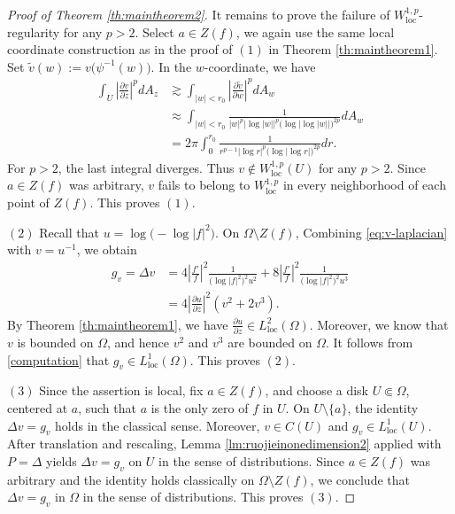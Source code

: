\documentclass[12pt,twoside]{amsart}
\numberwithin{equation}{section}
\numberwithin{definition}{section} %
\begin{document}
\begin{proof}[Proof of Theorem \ref{th:maintheorem2}]
It remains to prove the failure of $W^{1,p}_{\mathrm{loc}}$-regularity for any $p>2$. Select $a\in Z(f)$, we again use the same local coordinate construction as in the proof of $(1)$ in Theorem \ref{th:maintheorem1}. Set
$
\widetilde v(w):=v\bigl(\psi^{-1}(w)\bigr).
$
In the \(w\)-coordinate, we have
\[
\begin{aligned}
\int_U
\left|
\frac{\partial v}{\partial z}
\right|^p dA_z
&\gtrsim
\int_{|w|<r_0}
\left|
\frac{\partial\widetilde v}{\partial w}
\right|^p dA_w\\
&\approx
\int_{|w|<r_0}
\frac{1}
{|w|^p|\log|w||^p
\bigl(\log|\log|w||\bigr)^{2p}}dA_w\\
&=
2\pi\int_0^{r_0}
\frac{1}
{r^{p-1}|\log r|^p
\bigl(\log|\log r|\bigr)^{2p}}dr.
\end{aligned}
\]
For $p>2$, the last integral diverges. Thus $v\notin W^{1,p}_{\mathrm{loc}}(U)$ for any $p>2$. Since $a\in Z(f)$ was arbitrary, $v$ fails to belong to $W^{1,p}_{\mathrm{loc}}$ in every neighborhood of each point of $Z(f)$. This proves  $(1)$.

$(2)$ Recall that
$
u=\log\bigl(-\log|f|^2\bigr).
$
On $\Omega\setminus Z(f)$, Combining \eqref{eq:v-laplacian} with $v=u^{-1}$, we obtain
\begin{align} \label{computation}
g_v=\Delta v
&=
4\left|\frac{f'}{f}\right|^2
\frac{1}{\bigl(\log|f|^2\bigr)^2u^2}
+
8\left|\frac{f'}{f}\right|^2
\frac{1}{\bigl(\log|f|^2\bigr)^2u^3}\\ \nonumber
&=
4\left|
\frac{\partial u}{\partial z}
\right|^2
\left(
{v^2}+2{v^3}
\right).
\end{align}
By Theorem \ref{th:maintheorem1}, we have
$
\frac{\partial u}{\partial z}
\in L_{\mathrm{loc}}^2(\Omega).
$
Moreover, we know that $v$ is bounded on $\Omega$, and hence $v^{2}$ and $v^{3}$ are bounded on $\Omega$. It follows from \eqref{computation} that
$
g_v\in L_{\mathrm{loc}}^1(\Omega).
$
 This proves $(2)$.

$(3)$ Since the assertion is local, fix $a\in Z(f)$, and choose a disk $U\Subset\Omega$, centered at $a$, such that $a$ is the only zero of $f$ in $U$. On $U\setminus\{a\}$, the identity
$
\Delta v=g_v
$
holds in the classical sense. Moreover,
$v\in C(U)$ and $g_v\in L_{\mathrm{loc}}^1(U)$.
After translation and rescaling, Lemma \ref{lm:ruojieinonedimension2} applied with $P=\Delta$ yields
$\Delta v=g_v$ on $U$
in the sense of distributions. Since $a\in Z(f)$ was arbitrary and the identity holds classically on $\Omega\setminus Z(f)$, we conclude that
$
\Delta v=g_v$ in $\Omega$ in the sense of distributions. This proves $(3)$.



\end{proof}
\end{document}
